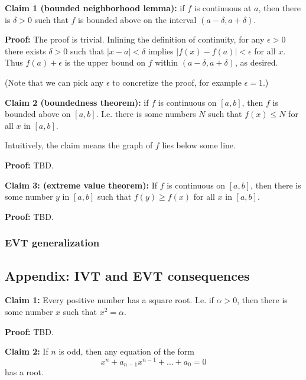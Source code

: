 \vs

\textbf{Claim 1 (bounded neighborhood lemma):} if $f$ is continuous at $a$, then there is $\delta>0$
such that $f$ is bounded above on the interval $(a-\delta, a+\delta)$.

\vs

\textbf{Proof:} The proof is trivial. Inlining the definition of
continuity, for any $\epsilon>0$ there exists $\delta>0$ such that
$|x-a|<\delta$ implies $|f(x)-f(a)|<\epsilon$ for all $x$. Thus
$f(a)+\epsilon$ is the upper bound on $f$ within
$(a-\delta, a+\delta)$, as desired.

\vs

(Note that we can pick any $\epsilon$ to concretize the proof, for example
$\epsilon=1$.)

\vs

\textbf{Claim 2 (boundedness theorem):} if $f$ is continuous on $[a,b]$, then $f$ is bounded
above on $[a,b]$. I.e. there is some numbers $N$ such that $f(x)\leq N$
for all $x$ in $[a,b]$.

\vs

Intuitively, the claim means the graph of $f$ lies below some line.

\vs

\textbf{Proof:} TBD.

\vs

\textbf{Claim 3: (extreme value theorem):} If $f$ is continuous on
$[a,b]$, then there is some number $y$ in $[a,b]$ such that
$f(y)\geq f(x)$ for all $x$ in $[a,b]$.

\vs

\textbf{Proof:} TBD.

\subsubsection*{EVT generalization}


\subsection{Appendix: IVT and EVT consequences}

\textbf{Claim 1:} Every positive number has a square root. I.e. if
$\alpha>0$, then there is some number $x$ such that $x^{2}=\alpha$.

\vs

\textbf{Proof:} TBD.

\vs

\textbf{Claim 2:} If $n$ is odd, then any equation of the form
\[x^{n}+a_{n-1}x^{n-1}+\ldots+a_{0}=0\]
has a root.

